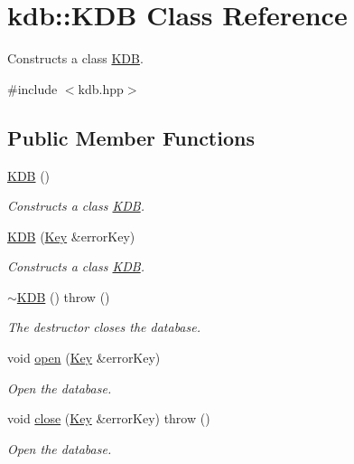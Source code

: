 \hypertarget{classkdb_1_1KDB}{\section{kdb\-:\-:K\-D\-B Class Reference}
\label{classkdb_1_1KDB}
}


Constructs a class \hyperlink{classkdb_1_1KDB}{K\-D\-B}.   




{\ttfamily \#include $<$kdb.\-hpp$>$}

\subsection*{Public Member Functions}
\begin{DoxyCompactItemize}
\item 
\hyperlink{classkdb_1_1KDB_a7e0637995ce9f294cdbc6f167df6db40}{K\-D\-B} ()
\begin{DoxyCompactList}\small\item\em Constructs a class \hyperlink{classkdb_1_1KDB}{K\-D\-B}. \end{DoxyCompactList}\item 
\hyperlink{classkdb_1_1KDB_a98e25c7fe2f47c5a90461676c6d219e7}{K\-D\-B} (\hyperlink{classkdb_1_1Key}{Key} \&error\-Key)
\begin{DoxyCompactList}\small\item\em Constructs a class \hyperlink{classkdb_1_1KDB}{K\-D\-B}. \end{DoxyCompactList}\item 
\hyperlink{classkdb_1_1KDB_af61bf771d2b75df730226fcae57eaa25}{$\sim$\-K\-D\-B} ()  throw ()
\begin{DoxyCompactList}\small\item\em The destructor closes the database. \end{DoxyCompactList}\item 
void \hyperlink{classkdb_1_1KDB_aee37484b06164eacc0cc11b7b40ab892}{open} (\hyperlink{classkdb_1_1Key}{Key} \&error\-Key)
\begin{DoxyCompactList}\small\item\em Open the database. \end{DoxyCompactList}\item 
void \hyperlink{classkdb_1_1KDB_aa027a8f798a2cfee11ff712eb204c35d}{close} (\hyperlink{classkdb_1_1Key}{Key} \&error\-Key)  throw ()
\begin{DoxyCompactList}\small\item\em Open the database. \end{DoxyCompactList}\item 

\end{DoxyCompactItemize}
